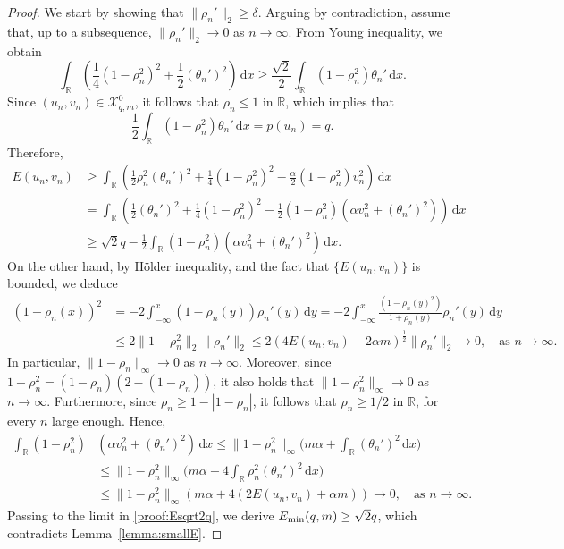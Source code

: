 \documentclass[11pt]{article}
\newcommand{\R}{\mathbb{R}}
\newcommand{\boX}{\mathcal{X}}
\newcommand{\Emin}{E_\textup{min}}
\renewcommand{\d}{\,\mathrm{d}}
\theoremstyle{plain}
\theoremstyle{definition}
\theoremstyle{remark}
\numberwithin{equation}{section}
\begin{document}
{\begin{proof}
    We start by showing that $\|\rho_n'\|_2\geq\delta$. Arguing by contradiction, assume that, up to a subsequence, $\|\rho_n'\|_2\to 0$ as $n\to \infty$. From Young inequality, we obtain
    \[\int_\R\left(\frac14(1-\rho_n^2)^2+\frac12(\theta_n')^2\right)\d x\geq \frac{\sqrt{2}}{2}\int_\R(1-\rho_n^2)\theta_n'\d x.\]
    Since $(u_n,v_n)\in\boX_{q,m}^0$, it follows that $\rho_n\leq 1$ in $\R$, which implies that 
    \[\frac{1}{2}\int_\R(1-\rho_n^2)\theta_n'\d x=p(u_n)=q.\]
    Therefore,  \begin{align}\label{proof:Esqrt2q}
        \nonumber E(u_n,v_n)&\geq \int_\R\left(\frac12\rho_n^2(\theta_n')^2+\frac14(1-\rho_n^2)^2-\frac{\alpha}{2}(1-\rho_n^2)v_n^2\right)\d x
        \\
        &=\int_\R\left(\frac12 (\theta_n')^2+\frac14(1-\rho_n^2)^2-\frac{1}{2}(1-\rho_n^2)(\alpha v_n^2+(\theta_n')^2)\right)\d x
        \\
        \nonumber &\geq \sqrt{2}q - \frac{1}{2}\int_\R (1-\rho_n^2)(\alpha v_n^2+(\theta_n')^2)\d x.
    \end{align}
    On the other hand, by H\"older inequality, and the fact that $\{E(u_n,v_n)\}$ is bounded, we deduce
    \begin{align*}
        (1-\rho_n(x))^2&=-2\int_{-\infty}^x(1-\rho_n(y))\rho_n'(y)\d y=-2\int_{-\infty}^x\frac{(1-\rho_n(y)^2)}{1+\rho_n(y)}\rho_n'(y)\d y
        \\
        &\leq 2\|1-\rho_n^2\|_2\|\rho_n'\|_2\leq 2(4E(u_n,v_n)+2\alpha m)^\frac12\|\rho_n'\|_2\to 0,\quad\text{as }n\to\infty. 
    \end{align*}
    In particular, $\|1-\rho_n\|_\infty\to 0$ as $n\to\infty$. Moreover, since $1-\rho_n^2=(1-\rho_n)(2-(1-\rho_n))$, it also holds that $\|1-\rho_n^2\|_\infty\to 0$ as $n\to\infty$. Furthermore, since $\rho_n\geq 1-|1-\rho_n|$, it follows that $\rho_n\geq 1/2$ in $\R$, for every $n$ large enough. Hence, 
    \begin{align*}
        \int_\R(1-\rho_n^2)&(\alpha v_n^2+(\theta_n')^2)\d x \leq \|1-\rho_n^2\|_\infty\Big(m\alpha+\int_\R(\theta_n')^2\d x\Big)
        \\
        &\leq \|1-\rho_n^2\|_\infty\Big(m\alpha+4\int_\R\rho_n^2(\theta_n')^2\d x\Big)
        \\
        &\leq \|1-\rho_n^2\|_\infty(m\alpha+4(2E(u_n,v_n)+\alpha m))\to 0,\quad\text{as }n\to\infty.
    \end{align*}
    Passing to the limit in \eqref{proof:Esqrt2q}, we derive $\Emin(q,m)\geq\sqrt{2}q$, which contradicts Lemma~\ref{lemma:smallE}.


\end{proof}}
\end{document}
